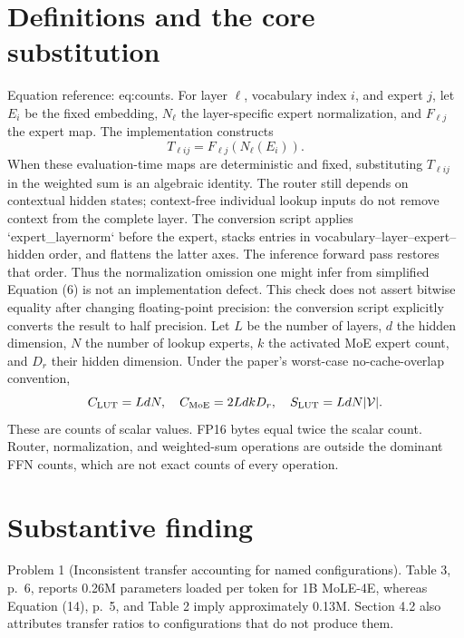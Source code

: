 \documentclass[10pt]{article}
\begin{document}
\section*{Definitions and the core substitution}
Equation reference: eq:counts. For layer \(\ell\), vocabulary index \(i\), and expert \(j\), let \(E_i\) be the fixed embedding, \(N_\ell\) the layer-specific expert normalization, and \(F_{\ell j}\) the expert map. The implementation constructs \[T_{\ell i j}=F_{\ell j}(N_\ell(E_i)).\] When these evaluation-time maps are deterministic and fixed, substituting \(T_{\ell i j}\) in the weighted sum is an algebraic identity. The router still depends on contextual hidden states; context-free individual lookup inputs do not remove context from the complete layer. The conversion script applies `expert\_layernorm` before the expert, stacks entries in vocabulary–layer–expert–hidden order, and flattens the latter axes. The inference forward pass restores that order. Thus the normalization omission one might infer from simplified Equation (6) is not an implementation defect. This check does not assert bitwise equality after changing floating-point precision: the conversion script explicitly converts the result to half precision. Let \(L\) be the number of layers, \(d\) the hidden dimension, \(N\) the number of lookup experts, \(k\) the activated MoE expert count, and \(D_r\) their hidden dimension. Under the paper’s worst-case no-cache-overlap convention, \[
 C_{\rm LUT}=LdN,\quad C_{\rm MoE}=2LdkD_r,\quad
 S_{\rm LUT}=LdN|\mathcal V|.\] These are counts of scalar values. FP16 bytes equal twice the scalar count. Router, normalization, and weighted-sum operations are outside the dominant FFN counts, which are not exact counts of every operation.\par
\section*{Substantive finding}
Problem 1 (Inconsistent transfer accounting for named configurations).  Table 3, p. 6, reports 0.26M parameters loaded per token for 1B MoLE-4E, whereas Equation (14), p. 5, and Table 2 imply approximately 0.13M. Section 4.2 also attributes transfer ratios to configurations that do not produce them.\par
\end{document}
